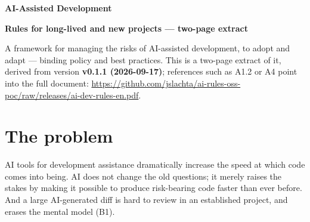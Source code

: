 

\renewcommand{\doctitle}{AI-Assisted Development — two-page extract}
\renewcommand{\docsubject}{Two-page extract of a policy template for AI-assisted development}
\renewcommand{\versionline}{extract of v0.1.1 (2026-09-17)}



{\sffamily\LARGE\bfseries\color{navy}AI-Assisted Development\par}
\vspace{2pt}
{\sffamily\large\bfseries\color{blue}Rules for long-lived and new projects --- two-page extract\par}
\vspace{6pt}
\noindent{\color{blue}\rule{\linewidth}{1.2pt}}\par
\vspace{8pt}

\noindent
A framework for managing the risks of AI-assisted development, to adopt and adapt --- binding policy and best practices.
This is a two-page extract of it, derived from version \textbf{v0.1.1 (2026-09-17)}; references such as A1.2 or A4 point into the full document: \url{https://github.com/jslachta/ai-rules-oss-poc/raw/releases/ai-dev-rules-en.pdf}.

\section*{The problem}

AI tools for development assistance dramatically increase the speed at which code comes into being.
AI does not change the old questions; it merely raises the stakes by making it possible to produce risk-bearing code faster than ever before.
And a large AI-generated diff is hard to review in an established project, and erases the mental model (B1).

